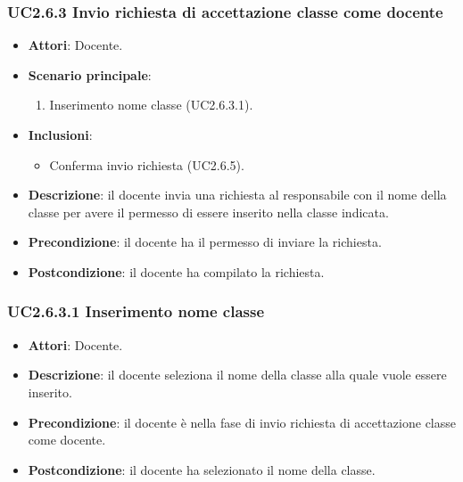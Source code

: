 \subsubsection{UC2.6.3 Invio richiesta di accettazione classe come docente}
\begin{itemize}
\item \textbf{Attori}: Docente.
\item \textbf{Scenario principale}:
\begin{enumerate}
\item Inserimento nome classe (UC2.6.3.1).
\end{enumerate}
\item \textbf{Inclusioni}:
\begin{itemize}
\item Conferma invio richiesta (UC2.6.5).
\end{itemize}
\item \textbf{Descrizione}: il docente invia una richiesta al responsabile con il nome della classe per avere il permesso di essere inserito nella classe indicata.
\item \textbf{Precondizione}: il docente ha il permesso di inviare la richiesta.
\item \textbf{Postcondizione}: il docente ha compilato la richiesta.
\end{itemize}
\subsubsection{UC2.6.3.1 Inserimento nome classe}
\begin{itemize}
\item \textbf{Attori}: Docente.
\item \textbf{Descrizione}: il docente seleziona il nome della classe alla quale vuole essere inserito.
\item \textbf{Precondizione}: il docente è nella fase di invio richiesta di accettazione classe come docente.
\item \textbf{Postcondizione}: il docente ha selezionato il nome della classe.
\end{itemize}
